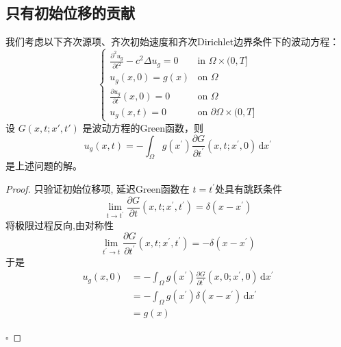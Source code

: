 \documentclass[../../main.tex]{subfiles}
\begin{document}
\subsection{只有初始位移的贡献}
\begin{theorem}
    我们考虑以下齐次源项、齐次初始速度和齐次Dirichlet边界条件下的波动方程：
    $$ \begin{cases} \frac{\partial^2 u_g}{\partial t^2} - c^2 \Delta u_g = 0 & \text{in } \Omega \times (0, T] \\ u_g(x,0) = g(x) & \text{on } \Omega \\ \frac{\partial u_g}{\partial t}(x,0) = 0 & \text{on } \Omega \\ u_g(x,t) = 0 & \text{on } \partial \Omega \times (0, T] \end{cases} $$
    设 $G(x,t; x',t')$ 是波动方程的Green函数，则
    $$ u_{g}(x,t)= -\int_{ \Omega }g(x^{\prime} )\frac{\partial G}{\partial t^{\prime}}(x,t;x^{\prime} ,0)\,\mathrm{d} x^{\prime} $$
    是上述问题的解。
\end{theorem}
\begin{proof}
    只验证初始位移项, 延迟Green函数在 \(  t= t^{\prime}   \)处具有跳跃条件  \[
    \lim_{t \to t^{\prime} }\frac{\partial G}{\partial t}\left( x,t;x^{\prime} ,t^{\prime}  \right)=  \delta \left( x-x^{\prime}  \right)  
    \]将极限过程反向,由对称性 \[
    \lim_{t^{\prime} \to t}\frac{\partial G}{\partial t^{\prime} }\left( x,t;x^{\prime} ,t^{\prime}  \right)=  - \delta \left( x-x^{\prime}  \right)  
    \]于是\[
    \begin{aligned}
    u_{g}\left( x,0 \right)&= - \int_{ \Omega }g\left( x^{\prime}  \right)\frac{\partial G}{\partial t^{\prime} }\left( x,0;x^{\prime} ,0 \right)\,\mathrm{d} x^{\prime} \\ 
     &=     -\int_{ \Omega }g\left( x^{\prime}  \right) \delta \left( x-x^{\prime}  \right)  \,\mathrm{d} x^{\prime}    \\ 
      &= g\left( x \right)
    \end{aligned}
    \]

    \hfill $\square$
\end{proof}
\end{document}
